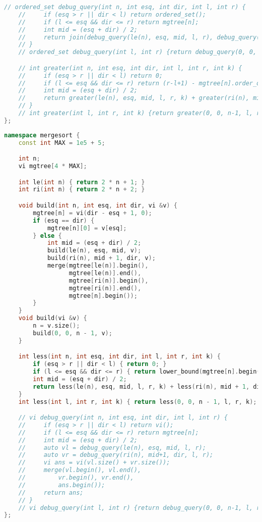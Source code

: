 \documentclass[11pt, a4paper, twoside]{book}
\begin{document}
\begin{lstlisting}[language=C++]
    // ordered_set debug_query(int n, int esq, int dir, int l, int r) {
    //     if (esq > r || dir < l) return ordered_set();
    //     if (l <= esq && dir <= r) return mgtree[n];
    //     int mid = (esq + dir) / 2;
    //     return join(debug_query(le(n), esq, mid, l, r), debug_query(ri(n), mid+1, dir, l, r));
    // }
    // ordered_set debug_query(int l, int r) {return debug_query(0, 0, n-1, l, r);}

    // int greater(int n, int esq, int dir, int l, int r, int k) {
    //     if (esq > r || dir < l) return 0;
    //     if (l <= esq && dir <= r) return (r-l+1) - mgtree[n].order_of_key({k, 1e8});
    //     int mid = (esq + dir) / 2;
    //     return greater(le(n), esq, mid, l, r, k) + greater(ri(n), mid+1, dir, l, r, k);
    // }
    // int greater(int l, int r, int k) {return greater(0, 0, n-1, l, r, k);}
};
\end{lstlisting}

\hfill

\begin{lstlisting}[language=C++]
namespace mergesort {
    const int MAX = 1e5 + 5;

    int n;
    vi mgtree[4 * MAX];

    int le(int n) { return 2 * n + 1; }
    int ri(int n) { return 2 * n + 2; }

    void build(int n, int esq, int dir, vi &v) {
        mgtree[n] = vi(dir - esq + 1, 0);
        if (esq == dir) {
            mgtree[n][0] = v[esq];
        } else {
            int mid = (esq + dir) / 2;
            build(le(n), esq, mid, v);
            build(ri(n), mid + 1, dir, v);
            merge(mgtree[le(n)].begin(),
                  mgtree[le(n)].end(),
                  mgtree[ri(n)].begin(),
                  mgtree[ri(n)].end(),
                  mgtree[n].begin());
        }
    }
    void build(vi &v) {
        n = v.size();
        build(0, 0, n - 1, v);
    }

    int less(int n, int esq, int dir, int l, int r, int k) {
        if (esq > r || dir < l) { return 0; }
        if (l <= esq && dir <= r) { return lower_bound(mgtree[n].begin(), mgtree[n].end(), k) - mgtree[n].begin(); }
        int mid = (esq + dir) / 2;
        return less(le(n), esq, mid, l, r, k) + less(ri(n), mid + 1, dir, l, r, k);
    }
    int less(int l, int r, int k) { return less(0, 0, n - 1, l, r, k); }

    // vi debug_query(int n, int esq, int dir, int l, int r) {
    //     if (esq > r || dir < l) return vi();
    //     if (l <= esq && dir <= r) return mgtree[n];
    //     int mid = (esq + dir) / 2;
    //     auto vl = debug_query(le(n), esq, mid, l, r);
    //     auto vr = debug_query(ri(n), mid+1, dir, l, r);
    //     vi ans = vi(vl.size() + vr.size());
    //     merge(vl.begin(), vl.end(),
    //         vr.begin(), vr.end(),
    //         ans.begin());
    //     return ans;
    // }
    // vi debug_query(int l, int r) {return debug_query(0, 0, n-1, l, r);}
};
\end{lstlisting}
\end{document}
